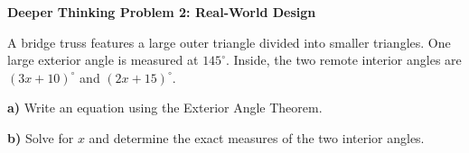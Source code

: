 \documentclass[12pt, letterpaper, fleqn]{article}
\begin{document}
\vspace{4mm}

\begin{tcolorbox}[colback=white!15, colframe=black, boxrule=1.5pt, arc=4mm, left=6mm, right=6mm, top=5mm, bottom=5mm]

\textbf{Deeper Thinking Problem 2: Real-World Design}

\medskip

\noindent
A bridge truss features a large outer triangle divided into smaller triangles. One large exterior angle is measured at $145^\circ$. Inside, the two remote interior angles are $(3x + 10)^\circ$ and $(2x + 15)^\circ$.

\vspace{5mm}

\noindent
\textbf{a)} Write an equation using the Exterior Angle Theorem.

\vspace{2.5cm}

\noindent
\textbf{b)} Solve for $x$ and determine the exact measures of the two interior angles.

\vspace{3cm}

\end{tcolorbox}
\end{document}
